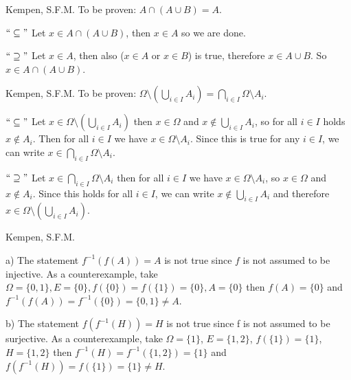 \begin{solution}[1.2]{Kempen, S.F.M.} To be proven: $A\cap (A\cup B) = A$. 

\noindent $``\subseteq"$ Let $x\in A\cap (A\cup B)$, then $x\in A$ so we are done.

\noindent $``\supseteq"$ Let $x\in A$, then also ($x\in A$ or $x\in B$) is true, therefore $x\in A\cup B$. So $x\in A\cap (A\cup B)$. 
\end{solution}

\begin{solution}[1.5]{Kempen, S.F.M.} To be proven: $\Omega \setminus \left(\bigcup_{i\in I} A_i \right) = \bigcap_{i\in I} \Omega \setminus A_i$. 

\noindent $``\subseteq"$ Let $x\in \Omega \setminus \left(\bigcup_{i\in I} A_i \right)$ then $x\in \Omega$ and $x\notin \bigcup_{i\in I} A_i$, so for all $i \in I $ holds $x\notin A_i$. Then for all $i \in I$ we have $x\in \Omega\setminus A_i$. Since this is true for any $i\in I$, we can write $x\in \bigcap_{i\in I} \Omega \setminus A_i$. 

\noindent $``\supseteq"$ Let $x\in \bigcap_{i\in I} \Omega \setminus A_i$ then for all $i\in I$ we have $x\in \Omega\setminus A_i$, so $x\in \Omega$ and $x\notin A_i$. Since this holds for all $i\in I$, we can write $x\notin \bigcup_{i\in I} A_i $ and therefore $x\in \Omega \setminus \left(\bigcup_{i\in I} A_i \right)$.
\end{solution}

\begin{solution}[1.8]{Kempen, S.F.M.} 
    
\noindent a) The statement $f^{-1}(f(A)) = A$ is not true since $f$ is not assumed to be injective. As a counterexample, take $\Omega = \{0,1\}, E = \{0\}, f(\{0\}) = f(\{1\}) = \{0\}, A = \{0\}$ then $f(A) = \{0\}$ and $f^{-1}(f(A)) = f^{-1}(\{0\}) = \{0,1\} \neq A$.

\noindent b) The statement $f(f^{-1}(H)) = H$ is not true since f is not assumed to be surjective. As a counterexample, take $\Omega = \{1\}$, $E = \{1,2\}$, $f(\{1\}) = \{1\}$, $H = \{1,2\}$ then $f^{-1}(H) = f^{-1}(\{1,2\}) = \{1\}$ and $f(f^{-1}(H)) = f(\{1\}) = \{1\} \neq H$.
\end{solution}